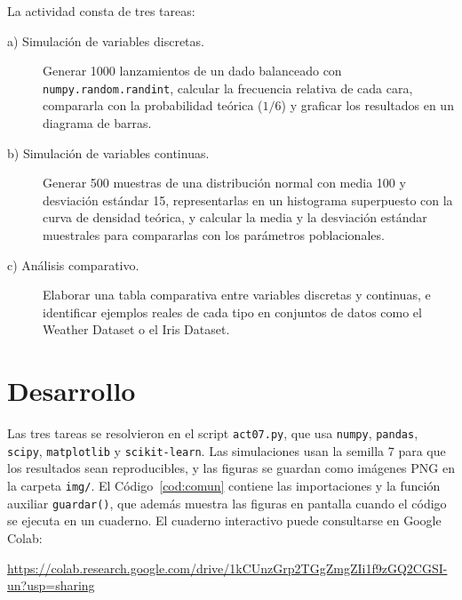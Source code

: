 \documentclass[11pt,letterpaper]{article}
\begin{document}
La actividad consta de tres tareas:

\begin{description}
    \item[a) Simulación de variables discretas.] Generar 1000 lanzamientos de un dado balanceado con \texttt{numpy.random.randint}, calcular la frecuencia relativa de cada cara, compararla con la probabilidad teórica ($1/6$) y graficar los resultados en un diagrama de barras.
    \item[b) Simulación de variables continuas.] Generar 500 muestras de una distribución normal con media 100 y desviación estándar 15, representarlas en un histograma superpuesto con la curva de densidad teórica, y calcular la media y la desviación estándar muestrales para compararlas con los parámetros poblacionales.
    \item[c) Análisis comparativo.] Elaborar una tabla comparativa entre variables discretas y continuas, e identificar ejemplos reales de cada tipo en conjuntos de datos como el Weather Dataset o el Iris Dataset.
\end{description}

\section{Desarrollo}

Las tres tareas se resolvieron en el script \texttt{act07.py}, que usa \texttt{numpy}, \texttt{pandas}, \texttt{scipy}, \texttt{matplotlib} y \texttt{scikit-learn}. Las simulaciones usan la semilla 7 para que los resultados sean reproducibles, y las figuras se guardan como imágenes PNG en la carpeta \texttt{img/}. El Código~\ref{cod:comun} contiene las importaciones y la función auxiliar \texttt{guardar()}, que además muestra las figuras en pantalla cuando el código se ejecuta en un cuaderno. El cuaderno interactivo puede consultarse en Google Colab:

\begin{center}
    \url{https://colab.research.google.com/drive/1kCUnzGrp2TGgZmgZIi1f9zGQ2CGSI-un?usp=sharing}
\end{center}
\end{document}
